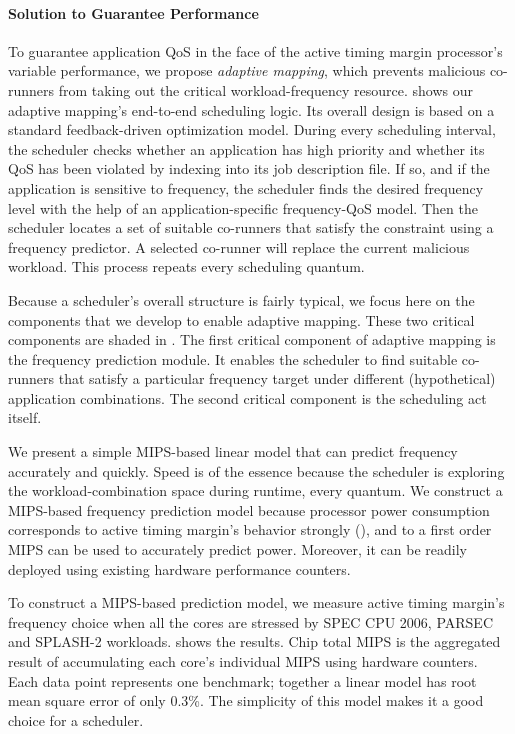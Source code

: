 \paragraph{Solution to Guarantee Performance} 

To guarantee application QoS in the face of the active timing margin processor's variable performance, we propose \emph{adaptive mapping}, which prevents malicious co-runners from taking out the critical workload-frequency resource.  shows our adaptive mapping's end-to-end scheduling logic. Its overall design is based on a standard feedback-driven optimization model. During every scheduling interval, the scheduler checks whether an application has high priority and whether its QoS has been violated by indexing into its job description file. If so, and if the application is sensitive to frequency, the scheduler finds the desired frequency level with the help of an application-specific frequency-QoS model. Then the scheduler locates a set of suitable co-runners that satisfy the constraint using a frequency predictor. A selected co-runner will replace the current malicious workload. This process repeats every scheduling quantum.

Because a scheduler's overall structure is fairly typical, we focus here on the components that we develop to enable adaptive mapping. These two critical components are shaded in . The first critical component of adaptive mapping is the frequency prediction module. It enables the scheduler to find suitable co-runners that satisfy a particular frequency target under different (hypothetical) application combinations. The second critical component is the scheduling act itself.

We present a simple MIPS-based linear model that can predict frequency accurately and quickly. Speed is of the essence because the scheduler is exploring the workload-combination space during runtime, every quantum. We construct a MIPS-based frequency prediction model because processor power consumption corresponds to active timing margin's behavior strongly (), and to a first order MIPS can be used to accurately predict power. Moreover, it can be readily deployed using existing hardware performance counters.

To construct a MIPS-based prediction model, we measure active timing margin's frequency choice when all the cores are stressed by SPEC CPU 2006, PARSEC and SPLASH-2 workloads.  shows the results. Chip total MIPS is the aggregated result of accumulating each core's individual MIPS using hardware counters. Each data point represents one benchmark; together a linear model has root mean square error of only 0.3\%. The simplicity of this model makes it a good choice for a scheduler.

